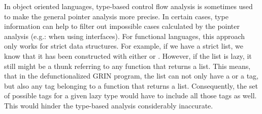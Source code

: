 \documentclass[main.tex]{subfiles}
\begin{document}
	In object oriented languages, type-based control flow analysis is sometimes used to make the general pointer analysis more precise. In certain cases, type information can help to filter out impossible cases calculated by the pointer analysis (e.g.: when using interfaces). For functional languages, this approach only works for strict data structures. For example, if we have a strict list, we know that it has been constructed with either  or . However, if the list is lazy, it still might be a thunk referring to any function that returns a list. This means, that in the defunctionalized GRIN program, the list can not only have a  or a  tag, but also any  tag belonging to a function that returns a list. Consequently, the set of possible tags for a given lazy type would have to include all those  tags as well. This would hinder the type-based analysis considerably inaccurate. 
	
	
	
\end{document}
